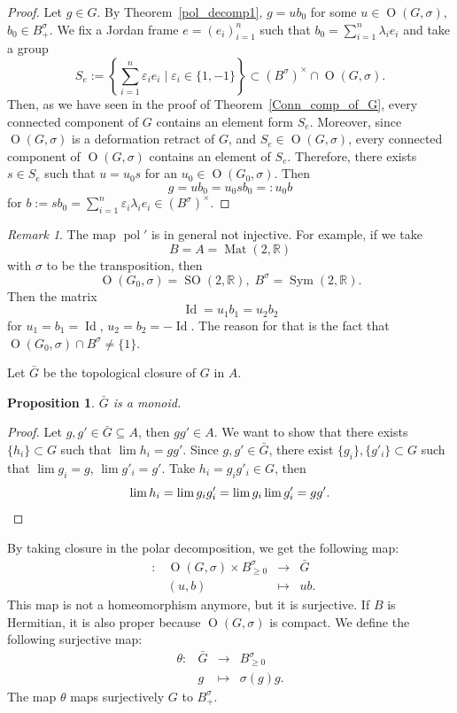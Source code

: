 \documentclass[a4paper,oneside,11pt]{amsart}
\DeclareMathOperator{\Id}{Id}
\DeclareMathOperator{\Sym}{Sym}
\DeclareMathOperator{\Mat}{Mat}
\DeclareMathOperator{\OO}{O}
\DeclareMathOperator{\SO}{SO}
\DeclareMathOperator{\pol}{pol}
\DeclareMathOperator{\bpol}{\overline{pol}}
\newcommand{\R}{\mathbb R}
\theoremstyle{plain}
\newtheorem{prop}[teo]{Proposition}
\theoremstyle{definition}
\theoremstyle{remark}
\newtheorem{rem}[teo]{Remark}
\begin{document}
\begin{proof}
Let $g\in G$. By Theorem~\ref{pol_decomp1}, $g=ub_0$ for some $u\in \OO(G,\sigma)$, $b_0\in B^{\sigma}_+$. We fix a Jordan frame $e=(e_i)_{i=1}^n$ such that $b_0=\sum_{i=1}^n\lambda_ie_i$ and take a group
$$S_e:=\left\{\sum_{i=1}^n\varepsilon_ie_i\mid \varepsilon_i\in\{1,-1\}\right\}\subset (B^{\sigma})^\times\cap \OO(G,\sigma).$$
Then, as we have seen in the proof of Theorem~\ref{Conn_comp_of_G}, every connected component of $G$ contains an element form $S_e$. Moreover, since $\OO(G,\sigma)$ is a deformation retract of $G$, and $S_e\in \OO(G,\sigma)$, every connected component of $\OO(G,\sigma)$ contains an element of $S_e$. Therefore, there exists $s\in S_e$ such that $u=u_0s$ for an $u_0\in \OO(G_0,\sigma)$. Then
$$g=ub_0=u_0sb_0=:u_0b$$
for $b:=sb_0=\sum_{i=1}^n\varepsilon_i\lambda_ie_i\in (B^{\sigma})^\times$.
\end{proof}

\begin{rem}
The map $\pol'$ is in general not injective. For example, if we take
$$B=A=\Mat(2,\R)$$
with $\sigma$ to be the transposition, then
$$\OO(G_0,\sigma)=\SO(2,\R),\; B^{\sigma}=\Sym(2,\R).$$
Then the matrix
$$\Id=u_1b_1=u_2b_2$$
for $u_1=b_1=\Id$, $u_2=b_2=-\Id$. The reason for that is the fact that $\OO(G_0,\sigma)\cap B^{\sigma}\neq \{1\}$.
\end{rem}

Let $\bar G$ be the topological closure of $G$ in $A$.
\begin{prop}
$\bar G$ is a monoid.
\end{prop}

\begin{proof}
Let $g,g'\in \bar G\subseteq A$, then $gg'\in A$. We want to show that there exists $\{h_i\}\subset G$ such that $\lim h_i=gg'$. Since $g,g'\in\bar G$, there exist $\{g_i\},\{g'_i\}\subset G$ such that $\lim g_i=g$, $\lim g'_i=g'$. Take $h_i=g_ig'_i\in G$, then
\begin{equation*}
\lim h_i=\lim g_ig'_i=\lim g_i\lim g'_i=gg'.\qedhere
\end{equation*}
\end{proof}


By taking closure in the polar decomposition, we get the following map:
$$\begin{matrix}
\bpol\colon & \OO(G,\sigma)\times B^{\sigma}_{\geq 0} & \to & \bar G \\
& (u,b) & \mapsto & ub.
\end{matrix}$$
This map is not a homeomorphism anymore, but it is surjective. If $B$ is Hermitian, it is also proper because $\OO(G,\sigma)$ is compact.   We define the following surjective map:
$$\begin{matrix}
\theta\colon &\bar G &\to &B^{\sigma}_{\geq 0}\\
& g &\mapsto & \sigma(g)g.
\end{matrix}$$
The map $\theta$ maps surjectively $G$ to $B^\sigma_+$.
\end{document}
